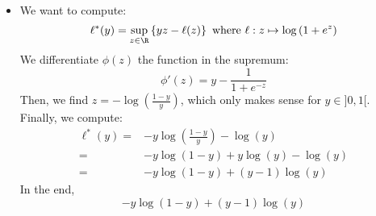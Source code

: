 \documentclass[math, info]{cours}
\begin{document}
\begin{itemize}
\begin{thm}
		\end{thm}
		\begin{proof}
			Let $x \in \R^{n}$. For all $y$, the directional derivative:
			\begin{equation*}
				\partial_{y}f(x) = \lim_{\d t \to 0} \frac{f\left( x + \d t y \right) - f(x)}{\d t}
			\end{equation*}
			is a sublinear as a function of $y$.
			From the Hahn-Banach theorem, there exists $\tilde{\partial f} \in \left(\R^{n}\right)^{*} = \R^{n}$ such that:
			\begin{equation*}
				\scalar{\tilde{\partial f},\cdot }\leq \partial_{y}f(x) \leq f\left( x + y \right) - f(x), \forall y \in \R^{n}
			\end{equation*}
			Then:
			\begin{equation*}
				f(x) + f^{*}\left( \tilde{\partial f} \right) = \scalar{\tilde{\partial f}, x}
			\end{equation*}
			which completes our proof that $f^{**} = f$.
		\end{proof}

	\item We want to compute:
		\begin{equation*}
			\ell^{*}(y) = \sup_{z\in \R}\left\{ yz - \ell(z) \right\} \text{ where } \ell: z\mapsto \log\left( 1 + e^{z} \right)
		\end{equation*}
		We differentiate $\phi(z)$ the function in the supremum:
		\begin{equation*}
			\phi'(z) = y - \frac{1}{1 + e^{-z}}
		\end{equation*}
		Then, we find $z = -\log\left( \frac{1 - y}{y} \right)$, which only makes sense for $y \in ]0, 1[$.
		Finally, we compute:
		\begin{equation*}
			\begin{aligned}
				\ell^{*}(y) =& -y\log\left( \frac{1-y}{y} \right) - \log(y)\\
				=& -y\log(1 - y) + y\log(y) - \log(y)\\
				=& -y\log\left( 1 - y \right) + \left( y - 1 \right)\log(y)
			\end{aligned}
		\end{equation*}
		In the end,
		\begin{equation*}
			\boxed{-y\log\left( 1 - y \right) + \left( y - 1 \right)\log\left( y \right)}
		\end{equation*}
\end{itemize}
\end{document}
